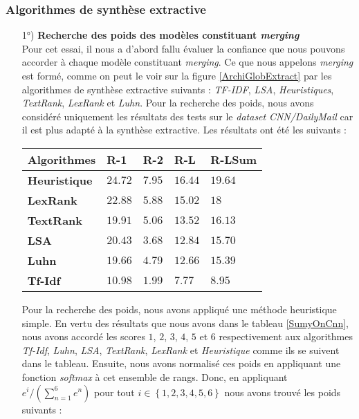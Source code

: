 \subsubsection{Algorithmes de synthèse extractive}
\begin{itemize}
\item[1°)] \textbf{Recherche des poids des modèles constituant \textit{merging}}\\
Pour cet essai, il nous a d'abord fallu évaluer la confiance que nous pouvons accorder à chaque modèle constituant \textit{merging}. Ce que nous appelons \textit{merging} est formé, comme on peut le voir sur la figure \ref{ArchiGlobExtract} par les algorithmes de synthèse extractive suivants : \textit{TF-IDF}, \textit{LSA}, \textit{Heuristiques}, \textit{TextRank}, \textit{LexRank} et \textit{Luhn}. Pour la recherche des poids, nous avons considéré uniquement les résultats des tests sur le \textit{dataset} \textit{CNN/DailyMail} car il est plus adapté à la synthèse extractive. Les résultats ont été les suivants :
\begin{center}
\label{SumyOnCnn}
\setlength{\arrayrulewidth}{1pt}
\begin{tabular}{|p{4cm}||p{2.5cm}|p{2.5cm}|p{2.5cm}|p{2.5cm}|}
\hline
\cellcolor{gris}\textbf{Algorithmes} & R-1  & R-2 & R-L & R-LSum \\
\hline
\hline
\textbf{Heuristique} & $ 24.72 $  & $ 7.95 $  & $ 16.44 $ & $ 19.64 $ \\
\hline
\textbf{LexRank} & $ 22.88 $ & $ 5.88 $  & $ 15.02 $ & $ 18 $ \\
\hline
\textbf{TextRank} & $ 19.91 $ & $ 5.06 $ & $ 13.52 $ & $ 16.13 $ \\
\hline
\textbf{LSA} & $ 20.43 $ & $ 3.68 $ & $ 12.84 $ & $ 15.70 $ \\
\hline
\textbf{Luhn} & $ 19.66 $ & $ 4.79 $ & $ 12.66 $ & $ 15.39 $ \\
\hline
\textbf{Tf-Idf} & $ 10.98 $ & $ 1.99 $ & $ 7.77 $ & $ 8.95 $ \\
\hline
\end{tabular}
\end{center}
Pour la recherche des poids, nous avons appliqué une méthode heuristique simple. En vertu des résultats que nous avons dans le tableau \ref{SumyOnCnn}, nous avons accordé les scores $ 1 $, $ 2 $, $ 3 $, $ 4 $, $ 5 $ et $ 6 $ respectivement aux algorithmes \textit{Tf-Idf}, \textit{Luhn}, \textit{LSA}, \textit{TextRank}, \textit{LexRank} et \textit{Heuristique} comme ils se suivent dans le tableau. Ensuite, nous avons normalisé ces poids en appliquant une fonction \textit{softmax} à cet ensemble de rangs. Donc, en appliquant $ e^{i}/\left( \sum_{n=1}^{6} e^{n}\right) $ pour tout $ i\in \left\lbrace 1, 2, 3, 4, 5, 6\right\rbrace $ nous avons trouvé les poids suivants :\newpage

\end{itemize}
